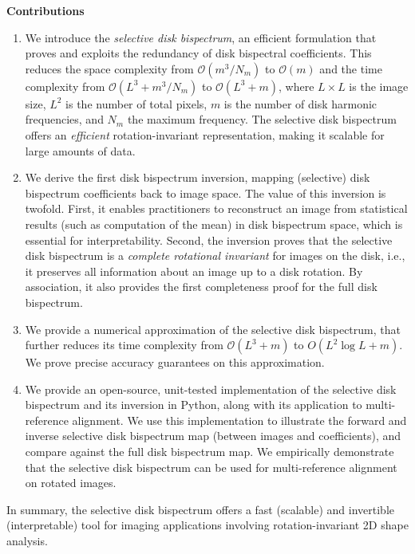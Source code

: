 \textbf{Contributions}
\begin{enumerate}[leftmargin=*]
\item We introduce the \textit{selective disk bispectrum}, an efficient formulation that proves and exploits the redundancy of disk bispectral coefficients. This reduces the space complexity from $\mathcal{O}(m^3/N_m)$ to $\mathcal{O}(m)$ and the time complexity from $\mathcal{O}(L^3+m^3/N_m)$ to  $\mathcal{O}(L^3 + m)$, where $L \times L$ is the image size, $L^2$ is the number of total pixels, $m$ is the number of disk harmonic frequencies, and $N_m$ the maximum frequency. The selective disk bispectrum offers an \textit{efficient} rotation-invariant representation, making it scalable for large amounts of data.

\item We derive the first disk bispectrum inversion, mapping (selective) disk bispectrum coefficients back to image space. The value of this inversion is twofold. First, it enables practitioners to reconstruct an image from statistical results (such as computation of the mean) in disk bispectrum space, which is essential for interpretability. Second, the inversion proves that the selective disk bispectrum is a \textit{complete rotational invariant} for images on the disk, i.e., it preserves all information about an image up to a disk rotation. By association, it also provides the first completeness proof for the full disk bispectrum.

\item We provide a numerical approximation of the selective disk bispectrum, that further reduces its time complexity from $\mathcal{O}(L^3 + m)$ to $O(L^2\log L + m)$. We prove precise accuracy guarantees on this approximation.

\item We provide an open-source, unit-tested implementation of the selective disk bispectrum and its inversion in Python, along with its application to multi-reference alignment. We use this implementation to illustrate the forward and inverse selective disk bispectrum map (between images and coefficients), and compare against the full disk bispectrum map. We empirically demonstrate that the selective disk bispectrum can be used for multi-reference alignment on rotated images.

\end{enumerate}

In summary, the selective disk bispectrum offers a fast (scalable) and invertible (interpretable) tool for imaging applications involving rotation-invariant 2D shape analysis.

